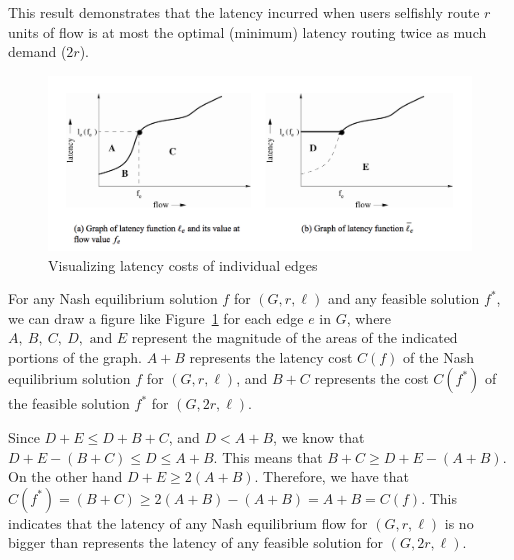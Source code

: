 \begin{proof-sketch}
    This result demonstrates that the latency incurred when users selfishly route $r$ units of flow is at most the optimal (minimum) latency routing twice as much demand ($2r$).

\begin{figure}[t!]
    \centering
    \includegraphics[width=.7\textwidth]{graph}
    \caption{Visualizing latency costs of individual edges}
    \label{fig:thm1}
\end{figure}

    For any Nash equilibrium solution $f$ for $(G, r, \ell)$ and any feasible solution $f^*$, we can draw a figure like Figure~\ref{fig:thm1} for each edge $e$ in $G$, where $A,~B,~C,~D,\text{ and } E$ represent the magnitude of the areas of the indicated portions of the graph.
    $A+B$ represents the latency cost $C(f)$ of the Nash equilibrium solution $f$ for $(G, r, \ell)$, and $B+C$ represents the cost $C(f^*)$ of the feasible solution $f^*$ for $(G, 2r, \ell)$. 
    
    Since $D+E \le D+B+C$, and $D < A+B$, we know that $D+E-(B+C)\le D \le A+B $. This means that $B+C\ge D+E -(A+B)$. On the other hand $D+E\ge 2(A+B)$. Therefore, we have that $C(f^*)=(B+C)\ge 2(A+B)-(A+B)= A+B= C(f)$. 
    This indicates that the latency of any Nash equilibrium flow for $(G, r, \ell)$ is no bigger than represents the latency of any feasible solution for $(G, 2r, \ell)$.
    

\end{proof-sketch}
